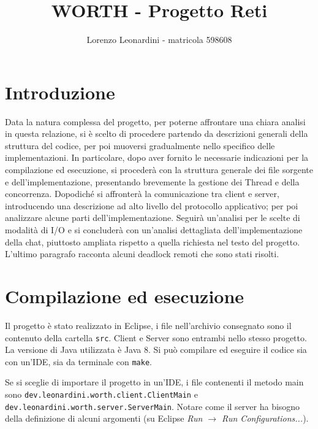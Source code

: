 \documentclass[a4paper,11pt] {article}
\title{\textbf{WORTH - Progetto Reti}}
\author{Lorenzo Leonardini - matricola 598608}
\date{}
\begin{document}
\maketitle

\section*{Introduzione}

Data la natura complessa del progetto, per poterne affrontare una chiara analisi in questa relazione, si è scelto di procedere partendo da descrizioni generali della struttura del codice, per poi muoversi gradualmente nello specifico delle implementazioni. In particolare, dopo aver fornito le necessarie indicazioni per la compilazione ed esecuzione, si procederà con la struttura generale dei file sorgente e dell'implementazione, presentando brevemente la gestione dei Thread e della concorrenza. Dopodiché si affronterà la comunicazione tra client e server, introducendo una descrizione ad alto livello del protocollo applicativo; per poi analizzare alcune parti dell'implementazione. Seguirà un'analisi per le scelte di modalità di I/O e si concluderà con un'analisi dettagliata dell'implementazione della chat, piuttosto ampliata rispetto a quella richiesta nel testo del progetto. L'ultimo paragrafo racconta alcuni deadlock remoti che sono stati risolti.

\section*{Compilazione ed esecuzione}

Il progetto è stato realizzato in Eclipse, i file nell'archivio consegnato sono il contenuto della cartella \texttt{src}. Client e Server sono entrambi nello stesso progetto. La versione di Java utilizzata è Java 8. Si può compilare ed eseguire il codice sia con un'IDE, sia da terminale con \texttt{make}.

Se si sceglie di importare il progetto in un'IDE, i file contenenti il metodo main sono \texttt{dev.leonardini.worth.client.ClientMain} e \texttt{dev.leonardini.worth.server.ServerMain}. Notare come il server ha bisogno della definizione di alcuni argomenti (su Eclipse \textit{Run $\to$ Run Configurations...}).
\end{document}
